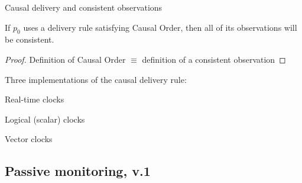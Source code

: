 \begin{frame}{Causal delivery and consistent observations}

\begin{theorem}
If $p_0$ uses a delivery rule satisfying Causal Order, then all of its
observations will be consistent.
\end{theorem}

\smallskip
\begin{proof}
Definition of Causal Order $\equiv$ definition of a consistent observation
\end{proof}

\bigskip
\begin{block}{Three implementations of the causal delivery rule:}
\BI
\item Real-time clocks
\item Logical (scalar) clocks
\item Vector clocks
\EI
\end{block}




\end{frame}


\subsection{Passive monitoring, v.1}

